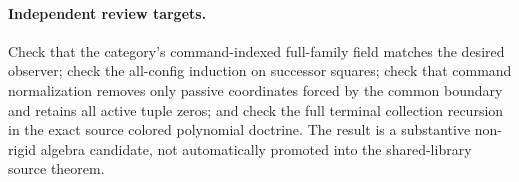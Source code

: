 \documentclass[11pt]{article}
\begin{document}
\paragraph{Independent review targets.} Check that the category's command-indexed full-family field matches the desired observer; check the all-config induction on successor squares; check that command normalization removes only passive coordinates forced by the common boundary and retains all active tuple zeros; and check the full terminal collection recursion in the exact source colored polynomial doctrine. The result is a substantive non-rigid algebra candidate, not automatically promoted into the shared-library source theorem.
\end{document}
